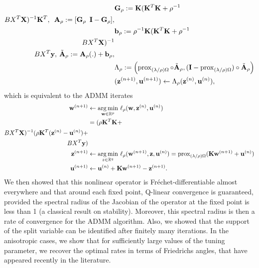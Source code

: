   \begin{eqnarray}
    \begin{aligned}
      &\mathbf{G}_{\rho} :=
      \mathbf{K}(\mathbf{K}^T\mathbf{K} + \rho^{-1}\\B{X}^T\mathbf{X})^{-1}\mathbf{K}^T,\hspace{.5em}
      \mathbf{A}_{\rho}:=[\mathbf{G}_{\rho}\hspace{.5em}\mathbf{I}-\mathbf{G}_{\rho}],\\
      &\mathbf{b}_{\rho} := \rho^{-1}\mathbf{K}(\mathbf{K}^T\mathbf{K} +
      \rho^{-1}\\B{X}^T\mathbf{X})^{-1}\\B{X}^T\mathbf{y},\hspace{.2em}\tilde{\mathbf{A}}_{\rho} :=
      \mathbf{A}_{\rho}(.) +  \mathbf{b}_{\rho},\\
      &\Lambda_{\rho} :=
        \left(\operatorname{prox}_{(\lambda/\rho)\Omega}\circ\tilde{\mathbf{A}}_{\rho},
        (\mathbf{I}-\operatorname{prox}_{(\lambda/\rho)\Omega})\circ\tilde{\mathbf{A}}_{\rho}\right)\\
        &(\mathbf{z}^{(n+1)}, \mathbf{u}^{(n+1)}) \leftarrow
        \Lambda_{\rho}(\mathbf{z}^{(n)}, \mathbf{u}^{(n)}),
    \end{aligned}
    \label{eq:factorize}
  \end{eqnarray}
which is equivalent to the ADMM iterates
\begin{eqnarray}
    \begin{split}
      \mathbf{w}^{(n+1)} &\leftarrow
      \underset{\mathbf{w} \in \mathbb R^p}{\operatorname*{arg\,min}}\text{ }\ell_{\rho}(\mathbf{w}, \mathbf{z}^{(n)},
      \mathbf{u}^{(n)}) \\
      &= (\rho \mathbf{K}^T\mathbf{K} + \\B{X}^T\mathbf{X})^{-1}(\rho\mathbf{K}^T(\mathbf{z}^{(n)} -
      \mathbf{u}^{(n)}) + \\B{X}^T\mathbf{y})\\
      \mathbf{z}^{(n+1)} &\leftarrow \underset{z \in \mathbb R^q}{\operatorname*{arg\,min}}\text{ }\ell_{\rho}(\mathbf{w}^{(n+1)},\mathbf{z}, \mathbf{u}^{(n)}) =
      \operatorname{prox}_{(\lambda/\rho)\Omega}(\mathbf{K}\mathbf{w}^{(n+1)} + \mathbf{u}^{(n)})\\
      \mathbf{u}^{(n+1)} &\leftarrow \mathbf{u}^{(n)} + \mathbf{K}\mathbf{w}^{(n+1)} -\mathbf{z}^{(n+1)}.
    \end{split}
\label{eq:admm}
\end{eqnarray}
We then showed that this nonlinear operator is
Fr\'echet-differentiable almost everywhere and that around each fixed
point, Q-linear convergence is guaranteed, provided the spectral
radius of the Jacobian of the operator at the fixed point is less than
1 (a classical result on stability). Moreover, this spectral radius is
then a rate of convergence for the ADMM algorithm. Also, we showed that
the support of the split variable can be identified after finitely
many iterations. In the anisotropic cases, we show that for
sufficiently large values of the tuning parameter, we recover the
optimal rates in terms of Friedrichs angles, that have appeared
recently in the literature.

